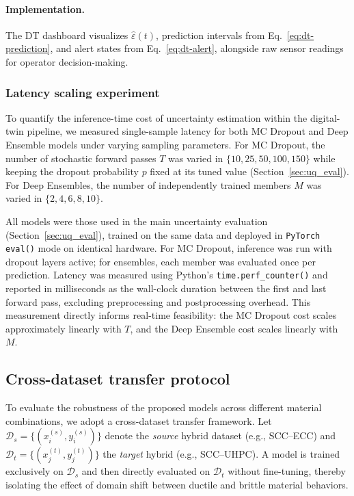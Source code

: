 \documentclass{article}
\begin{document}
\paragraph{Implementation.}
The DT dashboard visualizes $\hat{\varepsilon}(t)$, prediction intervals from Eq.~\eqref{eq:dt-prediction}, and alert states from Eq.~\eqref{eq:dt-alert}, alongside raw sensor readings for operator decision-making.

\subsubsection{Latency scaling experiment}
\label{subsec:latency_method}

To quantify the inference-time cost of uncertainty estimation within the digital-twin pipeline, we measured single-sample latency for both MC Dropout and Deep Ensemble models under varying sampling parameters.  
For MC Dropout, the number of stochastic forward passes $T$ was varied in $\{10, 25, 50, 100, 150\}$ while keeping the dropout probability $p$ fixed at its tuned value (Section~\ref{sec:uq_eval}).  
For Deep Ensembles, the number of independently trained members $M$ was varied in $\{2, 4, 6, 8, 10\}$.  

All models were those used in the main uncertainty evaluation (Section~\ref{sec:uq_eval}), trained on the same data and deployed in \texttt{PyTorch} \texttt{eval()} mode on identical hardware.  
For MC Dropout, inference was run with dropout layers active; for ensembles, each member was evaluated once per prediction.  
Latency was measured using Python's \texttt{time.perf\_counter()} and reported in milliseconds as the wall-clock duration between the first and last forward pass, excluding preprocessing and postprocessing overhead.  
This measurement directly informs real-time feasibility: the MC Dropout cost scales approximately linearly with $T$, and the Deep Ensemble cost scales linearly with $M$.

\subsection{Cross-dataset transfer protocol}
\label{subsec:transfer_method}

To evaluate the robustness of the proposed models across different material combinations, 
we adopt a cross-dataset transfer framework. Let $\mathcal{D}_s=\{(x_i^{(s)},y_i^{(s)})\}$ 
denote the \emph{source} hybrid dataset (e.g., SCC--ECC) and 
$\mathcal{D}_t=\{(x_j^{(t)},y_j^{(t)})\}$ the \emph{target} hybrid (e.g., SCC--UHPC). 
A model is trained exclusively on $\mathcal{D}_s$ and then directly evaluated on 
$\mathcal{D}_t$ without fine-tuning, thereby isolating the effect of domain shift 
between ductile and brittle material behaviors.
\end{document}
